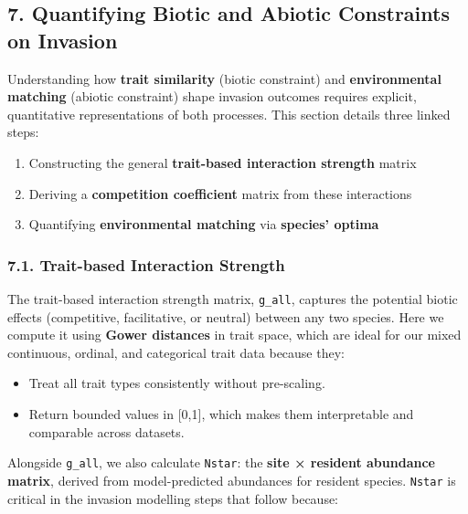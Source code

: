 \documentclass[
]{article}
\providecommand{\tightlist}{%
  \setlength{\itemsep}{0pt}\setlength{\parskip}{0pt}}
\begin{document}
\hypertarget{quantifying-biotic-and-abiotic-constraints-on-invasion}{%
\subsection{7. Quantifying Biotic and Abiotic Constraints on
Invasion}\label{quantifying-biotic-and-abiotic-constraints-on-invasion}}

Understanding how \textbf{trait similarity} (biotic constraint) and
\textbf{environmental matching} (abiotic constraint) shape invasion
outcomes requires explicit, quantitative representations of both
processes. This section details three linked steps:

\begin{enumerate}
\def\labelenumi{\arabic{enumi}.}
\tightlist
\item
  Constructing the general \textbf{trait-based interaction strength}
  matrix\\
\item
  Deriving a \textbf{competition coefficient} matrix from these
  interactions\\
\item
  Quantifying \textbf{environmental matching} via \textbf{species'
  optima}
\end{enumerate}

\hypertarget{trait-based-interaction-strength}{%
\subsubsection{7.1. Trait-based Interaction
Strength}\label{trait-based-interaction-strength}}

The trait-based interaction strength matrix, \texttt{g\_all}, captures
the potential biotic effects (competitive, facilitative, or neutral)
between any two species. Here we compute it using \textbf{Gower
distances} in trait space, which are ideal for our mixed continuous,
ordinal, and categorical trait data because they:

\begin{itemize}
\tightlist
\item
  Treat all trait types consistently without pre-scaling.
\item
  Return bounded values in {[}0,1{]}, which makes them interpretable and
  comparable across datasets.
\end{itemize}

Alongside \texttt{g\_all}, we also calculate \texttt{Nstar}: the
\textbf{site × resident abundance matrix}, derived from model-predicted
abundances for resident species. \texttt{Nstar} is critical in the
invasion modelling steps that follow because:
\end{document}
